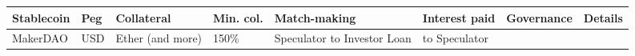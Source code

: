 \documentclass[english,]{IEEEtran}
\begin{document}
\begin{table}[t]\begin{center}\begin{supertabular}[]{@{}llllllll@{}}
\toprule
\begin{minipage}[b]{0.09\textwidth}\raggedright
Stablecoin\strut
\end{minipage} & \begin{minipage}[b]{0.04\textwidth}\raggedright
Peg\strut
\end{minipage} & \begin{minipage}[b]{0.13\textwidth}\raggedright
Collateral\strut
\end{minipage} & \begin{minipage}[b]{0.06\textwidth}\raggedright
Min. col.\strut
\end{minipage} & \begin{minipage}[b]{0.21\textwidth}\raggedright
Match-making\strut
\end{minipage} & \begin{minipage}[b]{0.11\textwidth}\raggedright
Interest paid\strut
\end{minipage} & \begin{minipage}[b]{0.09\textwidth}\raggedright
Governance\strut
\end{minipage} & \begin{minipage}[b]{0.06\textwidth}\raggedright
Details\strut
\end{minipage}\tabularnewline
\midrule
\begin{minipage}[t]{0.09\textwidth}\raggedright
MakerDAO\strut
\end{minipage} & \begin{minipage}[t]{0.04\textwidth}\raggedright
USD\strut
\end{minipage} & \begin{minipage}[t]{0.13\textwidth}\raggedright
Ether (and more)\strut
\end{minipage} & \begin{minipage}[t]{0.06\textwidth}\raggedright
150\%\strut
\end{minipage} & \begin{minipage}[t]{0.21\textwidth}\raggedright
Speculator to Investor Loan\strut
\end{minipage} & \begin{minipage}[t]{0.11\textwidth}\raggedright
to Speculator\strut
\end{minipage} & \begin{minipage}[t]{0.09\textwidth}\raggedright
\strut
\end{minipage} & \begin{minipage}[t]{0.06\textwidth}\raggedright

\end{minipage}
\end{supertabular}
\end{center}
\end{table}
\end{document}
